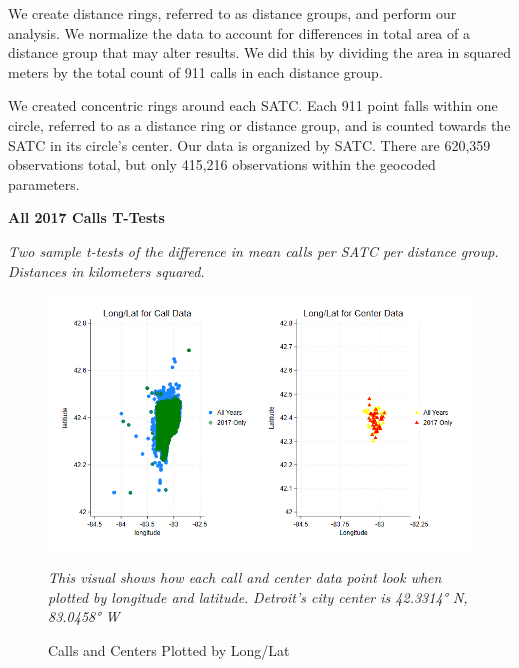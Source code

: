 \documentclass[12pt]{article}
\begin{document}
We create distance rings, referred to as distance groups, and perform our analysis. We normalize the data to account for differences in total area of a distance group that may alter results. We did this by dividing the area in squared meters by the total count of 911 calls in each distance group.

We created concentric rings around each SATC. Each 911 point falls within one circle, referred to as a distance ring or distance group, and is counted towards the SATC in its circle's center. Our data is organized by SATC. There are 620,359 observations total, but only 415,216 observations within the geocoded parameters.
\begin{table}[h]
\centering
\scalebox{0.8}{
\centering

}


\caption{\textbf{All 2017 Calls T-Tests}}
\label{tabl:Table1}
\centering\textit{Two sample t-tests of the difference in mean calls per SATC per distance group.}
\textit{Distances in kilometers squared.}
\end{table}


\begin{figure}[h!]
    \centering
\includegraphics[width=0.75\linewidth]{Reproducibility Package/Visual Graphics/Combined_Scatter.png}
    \caption{Calls and Centers Plotted by Long/Lat}
    \label{fig:Figure2}
     \textit{This visual shows how each call and center data point look when plotted by longitude and latitude.}
    \textit{Detroit's city center is 42.3314° N, 83.0458° W}
\end{figure}


\end{document}
